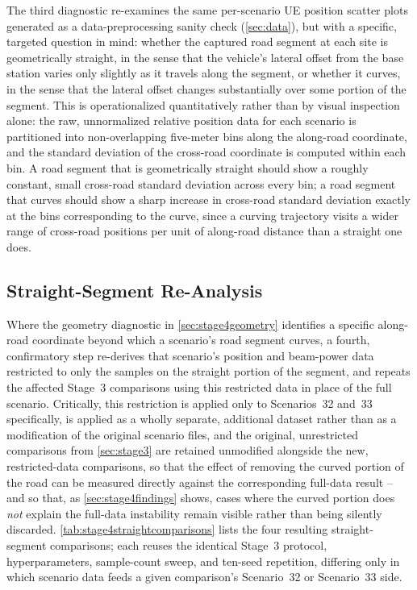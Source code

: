 \documentclass{iutbscthesis}
\begin{document}
The third diagnostic re-examines the same per-scenario UE position scatter plots generated as a data-preprocessing sanity check (\autoref{sec:data}), but with a specific, targeted question in mind: whether the captured road segment at each site is geometrically straight, in the sense that the vehicle's lateral offset from the base station varies only slightly as it travels along the segment, or whether it curves, in the sense that the lateral offset changes substantially over some portion of the segment. This is operationalized quantitatively rather than by visual inspection alone: the raw, unnormalized relative position data for each scenario is partitioned into non-overlapping five-meter bins along the along-road coordinate, and the standard deviation of the cross-road coordinate is computed within each bin. A road segment that is geometrically straight should show a roughly constant, small cross-road standard deviation across every bin; a road segment that curves should show a sharp increase in cross-road standard deviation exactly at the bins corresponding to the curve, since a curving trajectory visits a wider range of cross-road positions per unit of along-road distance than a straight one does.

\subsection{Straight-Segment Re-Analysis}
\label{sec:stage4straight}

Where the geometry diagnostic in \autoref{sec:stage4geometry} identifies a specific along-road coordinate beyond which a scenario's road segment curves, a fourth, confirmatory step re-derives that scenario's position and beam-power data restricted to only the samples on the straight portion of the segment, and repeats the affected Stage~3 comparisons using this restricted data in place of the full scenario. Critically, this restriction is applied only to Scenarios~32 and~33 specifically, is applied as a wholly separate, additional dataset rather than as a modification of the original scenario files, and the original, unrestricted comparisons from \autoref{sec:stage3} are retained unmodified alongside the new, restricted-data comparisons, so that the effect of removing the curved portion of the road can be measured directly against the corresponding full-data result -- and so that, as \autoref{sec:stage4findings} shows, cases where the curved portion does \emph{not} explain the full-data instability remain visible rather than being silently discarded. \autoref{tab:stage4straightcomparisons} lists the four resulting straight-segment comparisons; each reuses the identical Stage~3 protocol, hyperparameters, sample-count sweep, and ten-seed repetition, differing only in which scenario data feeds a given comparison's Scenario~32 or Scenario~33 side.
\end{document}
